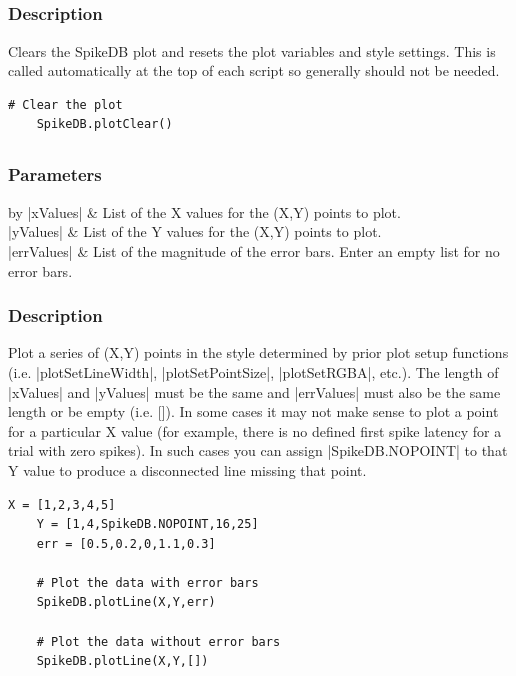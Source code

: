 \documentclass{report}
\begin{document}
\clearpage
\subsection{}
\subsubsection{Description}
Clears the SpikeDB plot and resets the plot variables and style settings. This is called automatically at the top of each script so generally should not be needed.
\begin{lstlisting}[caption=Example]
	# Clear the plot
	SpikeDB.plotClear()
\end{lstlisting}


\clearpage
\subsection{}
\subsubsection{Parameters}
\begin{table}[h]
\begin{center}
\begin{tabular}{by}
		|xValues| & List of the X values for the (X,Y) points to plot.\\
		|yValues| & List of the Y values for the (X,Y) points to plot.\\
		|errValues| & List of the magnitude of the error bars. Enter an empty list for no error bars.\\
	\end{tabular}
\end{center}
\end{table}
\subsubsection{Description}
Plot a series of (X,Y) points in the style determined by prior plot setup functions (i.e. |plotSetLineWidth|, |plotSetPointSize|, |plotSetRGBA|, etc.). The length of |xValues| and |yValues| must be the same and |errValues| must also be the same length or be empty (i.e. []). In some cases it may not make sense to plot a point for a particular X value (for example, there is no defined first spike latency for a trial with zero spikes).  In such cases you can assign |SpikeDB.NOPOINT| to that Y value to produce a disconnected line missing that point.
\begin{lstlisting}[caption=Example]
	X = [1,2,3,4,5]
	Y = [1,4,SpikeDB.NOPOINT,16,25]
	err = [0.5,0.2,0,1.1,0.3]

	# Plot the data with error bars
	SpikeDB.plotLine(X,Y,err)

	# Plot the data without error bars
	SpikeDB.plotLine(X,Y,[])
\end{lstlisting}
\end{document}
